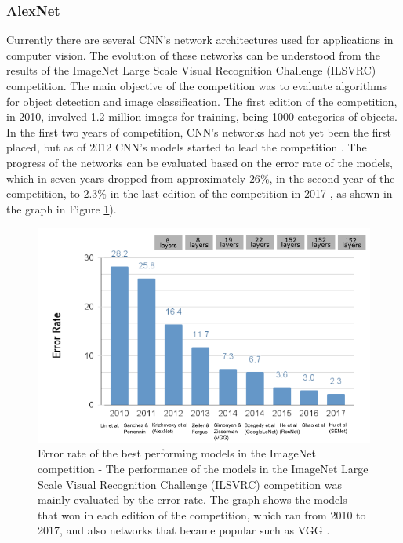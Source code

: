 \subsubsection{AlexNet}

Currently there are several CNN's network architectures used for applications in computer vision. The evolution of these networks can be understood from the results of the ImageNet Large Scale Visual Recognition Challenge (ILSVRC) competition. The main objective of the competition was to evaluate algorithms for object detection and image classification. The first edition of the competition, in 2010, involved 1.2 million images for training, being 1000 categories of objects. In the first two years of competition, CNN's networks had not yet been the first placed, but as of 2012 CNN's models started to lead the competition \cite{imagenet2020}. The progress of the networks can be evaluated based on the error rate of the models, which in seven years dropped from approximately $26\%$, in the second year of the competition, to $2.3\%$ in the last edition of the competition in 2017 \cite{johnson2019}, as shown in the graph in Figure \ref{fig:imagenet}).


\begin{figure}
    \centering
    \includegraphics[scale=0.4]{images/figure127.png}
    \caption{ Error rate of the best performing models in the ImageNet competition - The performance of the models in the ImageNet Large Scale Visual Recognition Challenge (ILSVRC) competition was mainly evaluated by the error rate. The graph shows the models that won in each edition of the competition, which ran from 2010 to 2017, and also networks that became popular such as VGG \cite{johnson2019}.}
    \label{fig:imagenet}
\end{figure}

